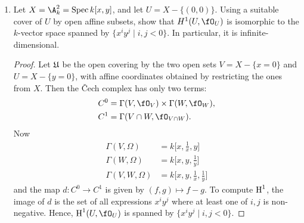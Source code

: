 \documentclass[a4paper]{article}
\begin{document}
\begin{enumerate} [label=\textbf{\arabic*.}, leftmargin=0em]
  \item Let $X = \A_k^2 = \spec{k[x, y]}$, and let $U = X - \{ (0, 0) \}$.
        Using a suitable cover of $U$ by open affine subsets, show that $H^1(U, \fO_U)$ is isomorphic to the $k$-vector space spanned by $\{ x^i y^j \mid i, j < 0 \}$.
        In particular, it is infinite-dimensional.

        \begin{proof}
          Let $\mathfrak{U}$ be the open covering by the two open sets $V = X - \{ x = 0 \}$ and $U = X - \{ y = 0 \}$, with affine coordinates obtained by restricting the ones from $X$.
          Then the Čech complex has only two terms:
          \begin{align*}
            C^0 & = \Gamma(V, \fO_V) \times \Gamma(W, \fO_W), \\
            C^1 & = \Gamma(V \cap W, \fO_{V \cap W}).
          \end{align*}
          Now
          \begin{align*}
            \Gamma(V, \Omega)    & = k\bigg[ x, \frac{1}{x}, y \bigg]              \\
            \Gamma(W, \Omega)    & = k\bigg[ x, y, \frac{1}{y}\bigg]               \\
            \Gamma(V, W, \Omega) & = k\bigg[ x, y, \frac{1}{x}, \frac{1}{y} \bigg]
          \end{align*}
          and the map $d : C^0 \to C^1$ is given by $(f, g) \mapsto f - g$. To compute $\operatorname{H}^1$, the image of $d$ is the set of all expressions $x^i y^j$ where at least one of $i, j$ is non-negative. Hence, $\cH^1(U, \fO_U)$ is spanned by $\{ x^iy^j \mid i, j < 0 \}$.
        \end{proof}


\end{enumerate}
\end{document}
